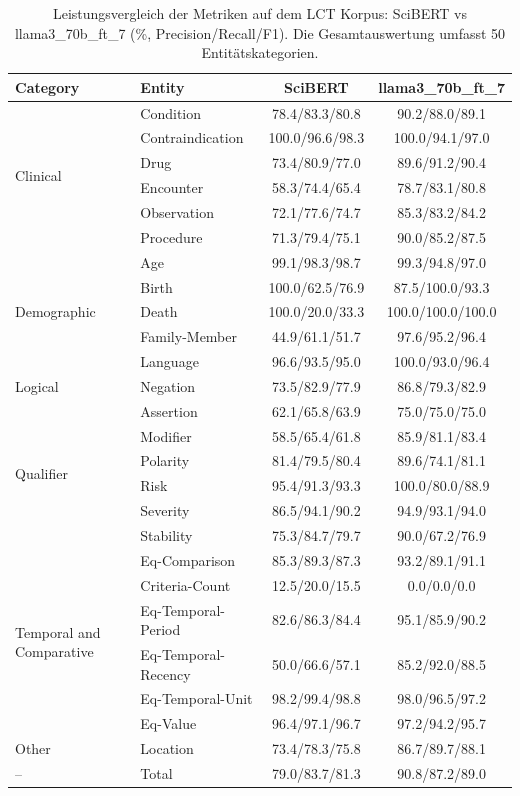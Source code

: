 
\begin{table}[htbp]
\centering
\begin{tabular}{llcc}
\toprule
\textbf{Category} & \textbf{Entity} & \textbf{SciBERT} & \textbf{llama3_70b_ft_7} \\
\midrule
\multirow{6}{*}{Clinical} & Condition & 78.4/83.3/80.8 & 90.2/88.0/89.1 \\
 & Contraindication & 100.0/96.6/98.3 & 100.0/94.1/97.0 \\
 & Drug & 73.4/80.9/77.0 & 89.6/91.2/90.4 \\
 & Encounter & 58.3/74.4/65.4 & 78.7/83.1/80.8 \\
 & Observation & 72.1/77.6/74.7 & 85.3/83.2/84.2 \\
 & Procedure & 71.3/79.4/75.1 & 90.0/85.2/87.5 \\
\midrule
\multirow{5}{*}{Demographic} & Age & 99.1/98.3/98.7 & 99.3/94.8/97.0 \\
 & Birth & 100.0/62.5/76.9 & 87.5/100.0/93.3 \\
 & Death & 100.0/20.0/33.3 & 100.0/100.0/100.0 \\
 & Family-Member & 44.9/61.1/51.7 & 97.6/95.2/96.4 \\
 & Language & 96.6/93.5/95.0 & 100.0/93.0/96.4 \\
\midrule
Logical & Negation & 73.5/82.9/77.9 & 86.8/79.3/82.9 \\
\midrule
\multirow{6}{*}{Qualifier} & Assertion & 62.1/65.8/63.9 & 75.0/75.0/75.0 \\
 & Modifier & 58.5/65.4/61.8 & 85.9/81.1/83.4 \\
 & Polarity & 81.4/79.5/80.4 & 89.6/74.1/81.1 \\
 & Risk & 95.4/91.3/93.3 & 100.0/80.0/88.9 \\
 & Severity & 86.5/94.1/90.2 & 94.9/93.1/94.0 \\
 & Stability & 75.3/84.7/79.7 & 90.0/67.2/76.9 \\
\midrule
\multirow{6}{*}{Temporal and Comparative} & Eq-Comparison & 85.3/89.3/87.3 & 93.2/89.1/91.1 \\
 & Criteria-Count & 12.5/20.0/15.5 & 0.0/0.0/0.0 \\
 & Eq-Temporal-Period & 82.6/86.3/84.4 & 95.1/85.9/90.2 \\
 & Eq-Temporal-Recency & 50.0/66.6/57.1 & 85.2/92.0/88.5 \\
 & Eq-Temporal-Unit & 98.2/99.4/98.8 & 98.0/96.5/97.2 \\
 & Eq-Value & 96.4/97.1/96.7 & 97.2/94.2/95.7 \\
\midrule
Other & Location & 73.4/78.3/75.8 & 86.7/89.7/88.1 \\
\midrule
-- & Total & 79.0/83.7/81.3 & 90.8/87.2/89.0 \\
\bottomrule
\end{tabular}
\caption{Leistungsvergleich der Metriken auf dem LCT Korpus: SciBERT vs llama3_70b_ft_7 (\%, Precision/Recall/F1). Die Gesamtauswertung umfasst 50 Entitätskategorien.}
\label{tab:metrics_comparison}
\end{table}
    